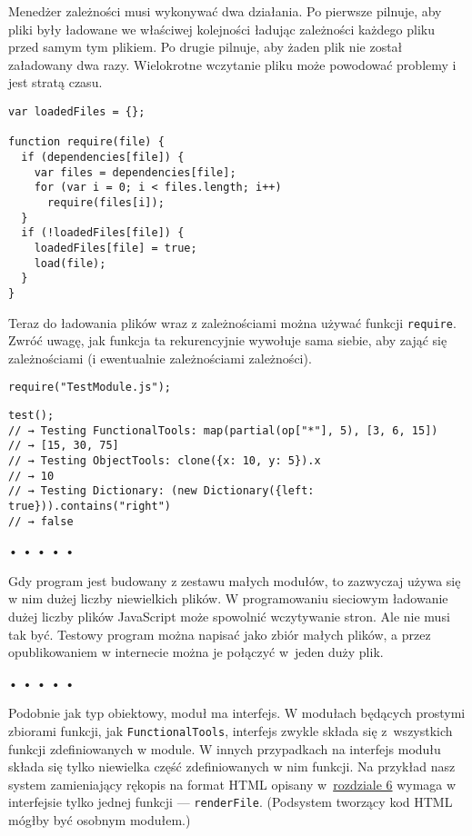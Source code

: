   
Menedżer zależności musi wykonywać dwa działania. Po pierwsze pilnuje, aby pliki były ładowane we właściwej kolejności ładując zależności każdego pliku przed samym tym plikiem. Po drugie pilnuje, aby żaden plik nie został załadowany dwa razy. Wielokrotne wczytanie pliku może powodować problemy i jest stratą czasu.

  
\begin{verbatim} 
var loadedFiles = {};

function require(file) {
  if (dependencies[file]) {
    var files = dependencies[file];
    for (var i = 0; i < files.length; i++)
      require(files[i]);
  }
  if (!loadedFiles[file]) {
    loadedFiles[file] = true;
    load(file);
  }
}
 \end{verbatim}
  
Teraz do ładowania plików wraz z zależnościami można używać funkcji \texttt{require}. Zwróć uwagę, jak funkcja ta rekurencyjnie wywołuje sama siebie, aby zająć się zależnościami (i ewentualnie zależnościami zależności).

  
\begin{verbatim} 
require("TestModule.js");
\end{verbatim}
  
\begin{verbatim} 
test();
// → Testing FunctionalTools: map(partial(op["*"], 5), [3, 6, 15])
// → [15, 30, 75]
// → Testing ObjectTools: clone({x: 10, y: 5}).x
// → 10
// → Testing Dictionary: (new Dictionary({left: true})).contains("right")
// → false
\end{verbatim}


\begin{center}
• • • • •
\end{center}

  
Gdy program jest budowany z zestawu małych modułów, to zazwyczaj używa się w nim dużej liczby niewielkich plików. W programowaniu sieciowym ładowanie dużej liczby plików JavaScript może spowolnić wczytywanie stron. Ale nie musi tak być. Testowy program można napisać jako zbiór małych plików, a przez opublikowaniem w internecie można je połączyć w~jeden duży plik.



\begin{center}
• • • • •
\end{center}

  
Podobnie jak typ obiektowy, moduł ma interfejs. W modułach będących prostymi zbiorami funkcji, jak \texttt{FunctionalTools}, interfejs zwykle składa się z~wszystkich funkcji zdefiniowanych w module. W innych przypadkach na interfejs modułu składa się tylko niewielka część zdefiniowanych w nim funkcji. Na przykład nasz system zamieniający rękopis na format HTML opisany w~\hyperref[chap:6]{rozdziale 6} wymaga w interfejsie tylko jednej funkcji — \texttt{renderFile}. (Podsystem tworzący kod HTML mógłby być osobnym modułem.)

